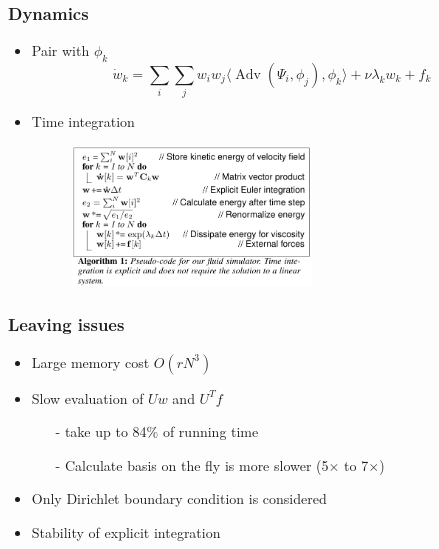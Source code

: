 \documentclass[serif,mathserif, 12pt]{beamer}
\DeclareMathOperator{\Adv}{Adv}
\begin{document}
\begin{frame}
  \frametitle{Dynamics}
  \begin{itemize}
  \item Pair with $\phi_k$
    \[
    \dot w_k = \sum_i\sum_j w_i w_j\langle \Adv(\Psi_i, \phi_j),\phi_k\rangle + \nu \lambda_k w_k  + f_k
    \]
  \item<3> Time integration
    \begin{figure}
      \centering
      \includegraphics[width=0.6\textwidth]{img/time_integration}
    \end{figure}
  \end{itemize}
\end{frame}

\begin{frame}
  \frametitle{Leaving issues}
  \begin{itemize}
  \item Large memory cost $O(rN^3)$
    \pause
  \item Slow evaluation of $Uw$ and $U^Tf$
    \pause
    \begin{itemize}
    \item[-] take up to 84\% of running time
      \pause
    \item[-] Calculate basis on the fly is more slower (5$\times$ to 7$\times$)
      \pause
    \end{itemize}
  \item Only Dirichlet boundary condition is considered
    \pause
  \item Stability of explicit integration
    \pause
  \end{itemize}
\end{frame}
\end{document}
